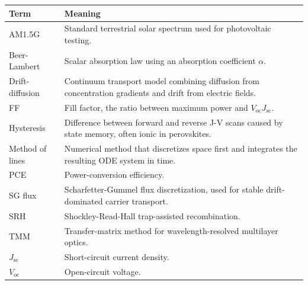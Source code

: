 \documentclass[
  11pt,
  american,
]{report}
\begin{document}
\begin{longtable}[]{@{}
  >{\raggedright\arraybackslash}p{}
  >{\raggedright\arraybackslash}p{}@{}}
\toprule
Term & Meaning \\
\midrule
\endhead
AM1.5G & Standard terrestrial solar spectrum used for photovoltaic
testing. \\
Beer-Lambert & Scalar absorption law using an absorption coefficient
\(\alpha\). \\
Drift-diffusion & Continuum transport model combining diffusion from
concentration gradients and drift from electric fields. \\
FF & Fill factor, the ratio between maximum power and
\(V_\mathrm{oc}J_\mathrm{sc}\). \\
Hysteresis & Difference between forward and reverse J-V scans caused by
state memory, often ionic in perovskites. \\
Method of lines & Numerical method that discretizes space first and
integrates the resulting ODE system in time. \\
PCE & Power-conversion efficiency. \\
SG flux & Scharfetter-Gummel flux discretization, used for stable
drift-dominated carrier transport. \\
SRH & Shockley-Read-Hall trap-assisted recombination. \\
TMM & Transfer-matrix method for wavelength-resolved multilayer
optics. \\
\(J_\mathrm{sc}\) & Short-circuit current density. \\
\(V_\mathrm{oc}\) & Open-circuit voltage. \\
\bottomrule
\end{longtable}
\end{document}

